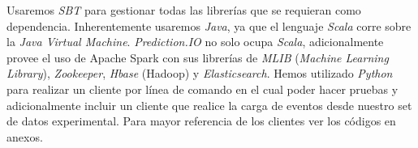 Usaremos \emph{SBT} para gestionar todas las librerías que se requieran como dependencia. Inherentemente usaremos \emph{Java}, ya que el lenguaje \emph{Scala} corre sobre la \emph{Java Virtual Machine}. \emph{Prediction.IO} no solo ocupa \emph{Scala}, adicionalmente provee el uso de {Apache Spark} con sus librerías de \emph{MLIB} (\emph{Machine Learning Library}), \emph{Zookeeper}, \emph{Hbase} (Hadoop) y \emph{Elasticsearch}. Hemos utilizado \emph{Python} para realizar un cliente por línea de comando en el cual poder hacer pruebas y adicionalmente incluir un cliente que realice la carga de eventos desde nuestro set de datos experimental. Para mayor referencia de los clientes ver los códigos en anexos.












